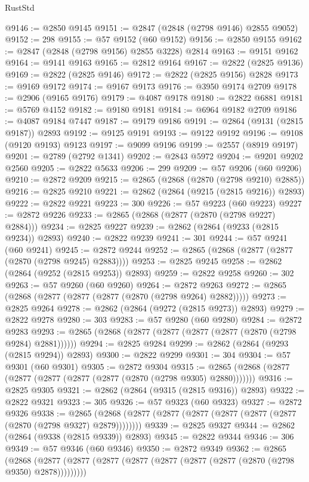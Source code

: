 \begin{lexlean}{RustStd}
\begin{coremodule}
@9146 := @2850 @9145
@9151 := @2847 (@2848 (@2798 @9146) @2855 @9052)
@9152 := 298
@9155 := @57 @9152 (@60 @9152)
@9156 := @2850 @9155
@9162 := @2847 (@2848 (@2798 @9156) @2855 @3228) @2814
@9163 := @9151 @9162
@9164 := @9141 @9163
@9165 := @2812 @9164
@9167 := @2822 (@2825 @9136)
@9169 := @2822 (@2825 @9146)
@9172 := @2822 (@2825 @9156) @2828
@9173 := @9169 @9172
@9174 := @9167 @9173
@9176 := @3950 @9174 @2709
@9178 := @2906 (@9165 @9176)
@9179 := @4087 @9178
@9180 := @2822 @6881
@9181 := @5769 @4152
@9182 := @9180 @9181
@9184 := @6964 @9182 @2709
@9186 := @4087 @9184 @7447
@9187 := @9179 @9186
@9191 := @2864 (@9131 (@2815 @9187)) @2893
@9192 := @9125 @9191
@9193 := @9122 @9192
@9196 := @9108 (@9120 @9193) @9123
@9197 := @9099 @9196
@9199 := @2557 (@8919 @9197)
@9201 := @2789 (@2792 @1341)
@9202 := @2843 @5972
@9204 := @9201 @9202 @2560
@9205 := @2822 @5633
@9206 := 299
@9209 := @57 @9206 (@60 @9206)
@9210 := @2872 @9209
@9215 := @2865 (@2868 (@2870 (@2798 @9210) @2885))
@9216 := @2825 @9210
@9221 := @2862 (@2864 (@9215 (@2815 @9216)) @2893)
@9222 := @2822 @9221
@9223 := 300
@9226 := @57 @9223 (@60 @9223)
@9227 := @2872 @9226
@9233 := @2865 (@2868 (@2877 (@2870 (@2798 @9227) @2884)))
@9234 := @2825 @9227
@9239 := @2862 (@2864 (@9233 (@2815 @9234)) @2893)
@9240 := @2822 @9239
@9241 := 301
@9244 := @57 @9241 (@60 @9241)
@9245 := @2872 @9244
@9252 := @2865 (@2868 (@2877 (@2877 (@2870 (@2798 @9245) @2883))))
@9253 := @2825 @9245
@9258 := @2862 (@2864 (@9252 (@2815 @9253)) @2893)
@9259 := @2822 @9258
@9260 := 302
@9263 := @57 @9260 (@60 @9260)
@9264 := @2872 @9263
@9272 := @2865 (@2868 (@2877 (@2877 (@2877 (@2870 (@2798 @9264) @2882)))))
@9273 := @2825 @9264
@9278 := @2862 (@2864 (@9272 (@2815 @9273)) @2893)
@9279 := @2822 @9278
@9280 := 303
@9283 := @57 @9280 (@60 @9280)
@9284 := @2872 @9283
@9293 := @2865 (@2868 (@2877 (@2877 (@2877 (@2877 (@2870 (@2798 @9284) @2881))))))
@9294 := @2825 @9284
@9299 := @2862 (@2864 (@9293 (@2815 @9294)) @2893)
@9300 := @2822 @9299
@9301 := 304
@9304 := @57 @9301 (@60 @9301)
@9305 := @2872 @9304
@9315 := @2865 (@2868 (@2877 (@2877 (@2877 (@2877 (@2877 (@2870 (@2798 @9305) @2880)))))))
@9316 := @2825 @9305
@9321 := @2862 (@2864 (@9315 (@2815 @9316)) @2893)
@9322 := @2822 @9321
@9323 := 305
@9326 := @57 @9323 (@60 @9323)
@9327 := @2872 @9326
@9338 := @2865 (@2868 (@2877 (@2877 (@2877 (@2877 (@2877 (@2877 (@2870 (@2798 @9327) @2879))))))))
@9339 := @2825 @9327
@9344 := @2862 (@2864 (@9338 (@2815 @9339)) @2893)
@9345 := @2822 @9344
@9346 := 306
@9349 := @57 @9346 (@60 @9346)
@9350 := @2872 @9349
@9362 := @2865
    (@2868 (@2877 (@2877 (@2877 (@2877 (@2877 (@2877 (@2877 (@2870 (@2798 @9350) @2878)))))))))

\end{coremodule}
\end{lexlean}
